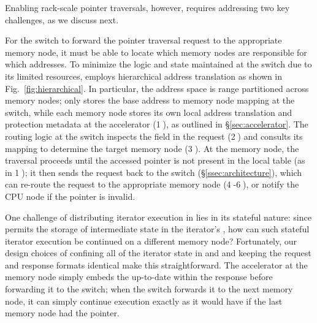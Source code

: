 Enabling rack-scale pointer traversals, however, requires addressing two key challenges, as we discuss next.

 For the switch to forward the pointer traversal request to the appropriate memory node, it must be able to locate which memory nodes are responsible for which addresses. To minimize the logic and state maintained at the switch due to its limited resources, \pulse employs hierarchical address translation as shown in Fig.~\ref{fig:hierarchical}. 
In particular, the address space is range partitioned across memory nodes; \pulse only stores the base address to memory node mapping at the switch, while each memory node stores its own local address translation and protection metadata at the accelerator (\textcircled{1}), as outlined in \S\ref{sec:accelerator}. The routing logic at the switch inspects the  field in the request (\textcircled{2}) and consults its mapping to determine the target memory node (\textcircled{3}). At the memory node, the traversal proceeds until the accessed pointer is not present in the local table (as in \textcircled{1}); it then sends the request back to the switch (\S\ref{ssec:architecture}), which can re-route the request to the appropriate memory node (\textcircled{4}-\textcircled{6}), or notify the CPU node if the pointer is invalid.

 One challenge of distributing iterator execution in \pulse lies in its stateful nature: since \pulse permits the storage of intermediate state in the iterator's , how can such stateful iterator execution be continued on a different memory node? Fortunately, our design choices of confining all of the iterator state in  and  and keeping the request and response formats identical make this straightforward. The accelerator at the memory node simply embeds the up-to-date  within the response before forwarding it to the switch; when the switch forwards it to the next memory node, it can simply continue execution exactly as it would have if the last memory node had the pointer. 




